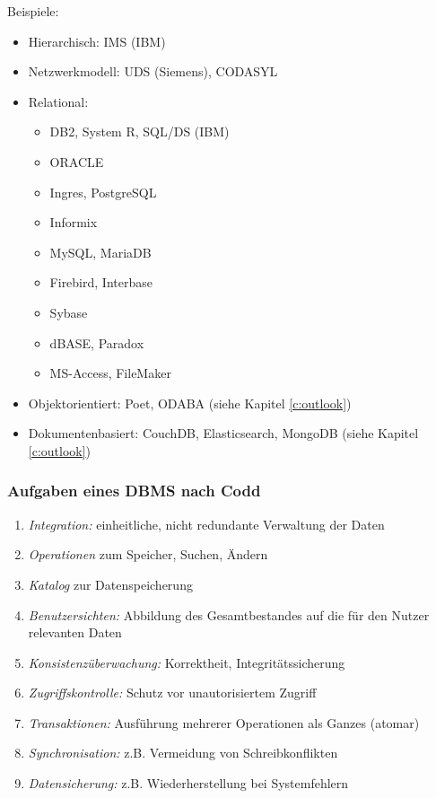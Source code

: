             Beispiele:
            \begin{itemize}
            	\item Hierarchisch: IMS (IBM)
            	\item Netzwerkmodell: UDS (Siemens), CODASYL
            	\item Relational:
                	\begin{itemize}
                		\item DB2, System R, SQL/DS (IBM)
                		\item ORACLE
                		\item Ingres, PostgreSQL
                		\item Informix
                		\item MySQL, MariaDB
                		\item Firebird, Interbase
                		\item Sybase
                		\item dBASE, Paradox
                		\item MS-Access, FileMaker
                	\end{itemize}
                \item Objektorientiert: Poet, ODABA (siehe Kapitel \ref{c:outlook})
                \item Dokumentenbasiert: CouchDB, Elasticsearch, MongoDB (siehe Kapitel \ref{c:outlook})
            \end{itemize}

            \subsubsection{Aufgaben eines DBMS nach Codd} %
                \begin{enumerate}
                	\item \textit{Integration:} einheitliche, nicht redundante Verwaltung der Daten
                	\item \textit{Operationen} zum Speicher, Suchen, Ändern
                	\item \textit{Katalog} zur Datenspeicherung
                	\item \textit{Benutzersichten:} Abbildung des Gesamtbestandes auf die für den Nutzer relevanten Daten
                	\item \textit{Konsistenzüberwachung:} Korrektheit, Integritätssicherung
                	\item \textit{Zugriffskontrolle:} Schutz vor unautorisiertem Zugriff
                	\item \textit{Transaktionen:} Ausführung mehrerer Operationen als Ganzes (atomar)
                	\item \textit{Synchronisation:} z.B. Vermeidung von Schreibkonflikten
                	\item \textit{Datensicherung:} z.B. Wiederherstellung bei Systemfehlern
                \end{enumerate}

